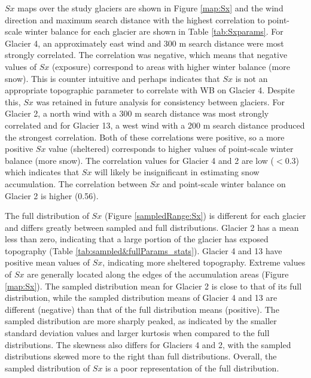 \documentclass{sfuthesis}
\begin{document}
$Sx$ maps over the study glaciers are shown in Figure \ref{map:Sx} and the wind direction and maximum search distance with the highest correlation to point-scale winter balance for each glacier are shown in Table \ref{tab:Sxparams}. For Glacier 4, an approximately east wind and 300 m search distance were most strongly correlated. The correlation was negative, which means that negative values of $Sx$ (exposure) correspond to areas with higher winter balance (more snow). This is counter intuitive and perhaps indicates that $Sx$ is not an appropriate topographic parameter to correlate with WB on Glacier 4. Despite this, $Sx$ was retained in future analysis for consistency between glaciers. For Glacier 2, a north wind with a 300 m search distance was most strongly correlated and for Glacier 13, a west wind with a 200 m search distance produced the strongest correlation. Both of these correlations were positive, so a more positive $Sx$ value (sheltered) corresponds to higher values of point-scale winter balance (more snow). The correlation values for Glacier 4 and 2 are low ($<$0.3) which indicates that $Sx$ will likely be insignificant in estimating snow accumulation. The correlation between $Sx$ and point-scale winter balance on Glacier 2 is higher (0.56). 

The full distribution of $Sx$ (Figure \ref{sampledRange:Sx}) is different for each glacier and differs greatly between sampled and full distributions. Glacier 2 has a mean less than zero, indicating that a large portion of the glacier has exposed topography (Table \ref{tab:sampled&fullParams_stats}). Glacier 4 and 13 have positive mean values of $Sx$, indicating more sheltered topography. Extreme values of $Sx$ are generally located along the edges of the accumulation areas (Figure \ref{map:Sx}). The sampled distribution mean for Glacier 2 is close to that of its full distribution, while the sampled distribution means of Glacier 4 and 13 are different (negative) than that of the full distribution means (positive). The sampled distribution are more sharply peaked, as indicated by the smaller standard deviation values and larger kurtosis when compared to the full distributions. The skewness also differs for Glaciers 4 and 2, with the sampled distributions skewed more to the right than full distributions. Overall, the sampled distribution of $Sx$ is a poor representation of the full distribution. 
\end{document}
